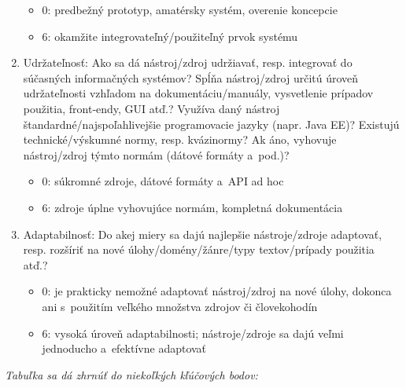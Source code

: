\begin{multicols}{2}
\begin{enumerate}
\begin{itemize}
\item 0: predbežný prototyp, amatérsky systém, overenie koncepcie
\item 6: okamžite integrovateľný/po\-u\-ži\-teľný prvok systému
\end{itemize}
\item Udržateľnosť: Ako sa dá nástroj/zdroj udržiavať, resp. integrovať do súčasných informačných systémov? Spĺňa nástroj/zdroj určitú úroveň udržateľnosti vzhľadom na dokumentáciu/manuály, vysvetlenie prípadov použitia, front‑endy, GUI atď.? Využíva daný nástroj štandardné/najspoľahlivejšie programovacie jazyky (napr. Java EE)? Existujú technické/výskumné normy, resp. kvázinormy? Ak áno, vyhovuje nástroj/zdroj týmto normám (dátové formáty a~pod.)?
\begin{itemize}
\item 0: súkromné zdroje, dátové formáty a~API ad hoc
\item 6: zdroje úplne vyhovujúce normám, kompletná dokumentácia
\end{itemize}
\item Adaptabilnosť: Do akej miery sa dajú najlepšie nástroje/zdroje adaptovať, resp. rozšíriť na nové úlohy/domény/žánre/typy textov/prí\-pa\-dy použitia atď.?
\begin{itemize}
\item 0: je prakticky nemožné adaptovať nástroj/zdroj na nové úlohy, dokonca ani s~použitím veľkého množstva zdrojov či človekohodín
\item 6: vysoká úroveň adaptabilnosti; nástroje/zdroje sa dajú veľmi jednoducho a~efektívne adaptovať
\end{itemize}
\end{enumerate}

\emph{Tabuľka sa dá zhrnúť do niekoľkých kľúčových bodov:}


\end{multicols}
